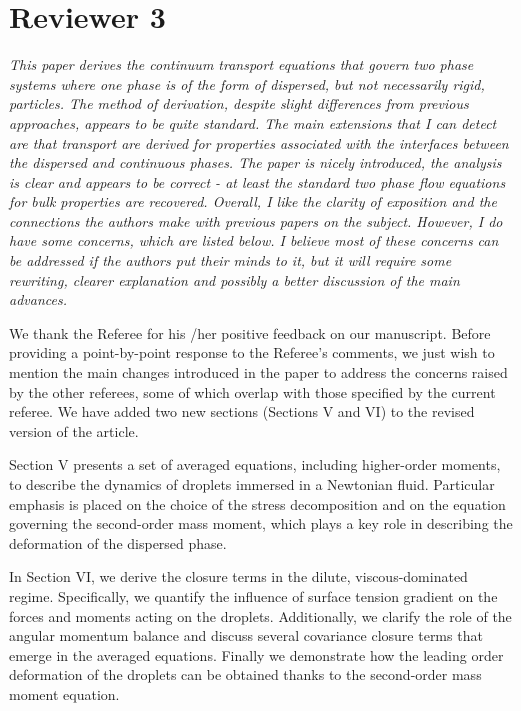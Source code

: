 \documentclass[10pt,a4paper]{article}
\newcommand{\tb}[1]{\color{blue}#1\color{black}}
\begin{document}
\section*{Reviewer 3}

\textit{This paper derives the continuum transport equations that govern two phase systems where
one phase is of the form of dispersed, but not necessarily rigid, particles. The method of
derivation, despite slight differences from previous approaches, appears to be quite standard.
The main extensions that I can detect are that transport are derived for properties associated
with the interfaces between the dispersed and continuous phases. The paper is nicely
introduced, the analysis is clear and appears to be correct - at least the standard two phase
flow equations for bulk properties are recovered. Overall, I like the clarity of exposition and
the connections the authors make with previous papers on the subject.
However, I do have some concerns, which are listed below. I believe most of these concerns
can be addressed if the authors put their minds to it, but it will require some rewriting, clearer
explanation and possibly a better discussion of the main advances.}

\tb{We thank the Referee for his /her positive feedback on our manuscript.
Before providing a point-by-point response to the Referee’s comments, we just wish to mention the main changes introduced in the paper to address the concerns raised by the other referees, some of which overlap with
those specified by the current referee.
We have added two new sections (Sections V and VI) to the revised version of the article.

Section V presents a set of averaged equations, including higher-order moments, to describe the dynamics of droplets immersed in a Newtonian fluid. 
Particular emphasis is placed on the choice of the stress decomposition and on the equation governing the second-order mass moment, which plays a key role in describing the deformation of the dispersed phase.

In Section VI, we derive the closure terms in the dilute, viscous-dominated regime. 
Specifically, we quantify the influence of surface tension gradient on the forces and moments acting on the droplets. 
Additionally, we clarify the role of the angular momentum balance and discuss several covariance closure terms that emerge in the averaged equations.
Finally we demonstrate how the leading order deformation of the droplets can be obtained thanks to the second-order mass moment equation.


}
\end{document}
